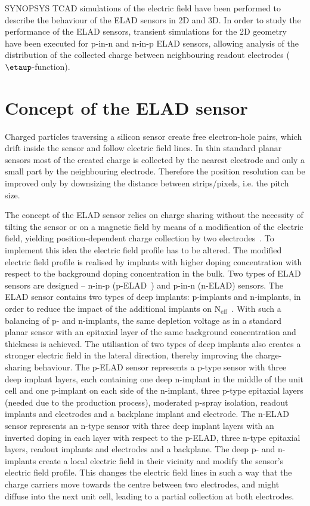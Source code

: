 \documentclass[a4paper,11pt]{article}
\begin{document}
SYNOPSYS TCAD simulations of the electric field have been performed to describe the behaviour of the ELAD sensors in 2D and 3D.
In order to study the performance of the ELAD sensors, transient simulations for the 2D geometry have been executed for p-in-n and n-in-p ELAD sensors,
 allowing analysis of the distribution of the collected charge between neighbouring readout electrodes ($\etaup$-function). 

\section{Concept of the ELAD sensor}
\label{sec:con}
Charged particles traversing a silicon sensor create free electron-hole pairs, which drift inside the sensor and follow electric field lines.
In thin standard planar sensors most of the created charge is collected by the nearest electrode and only a small part by the neighbouring electrode.
Therefore the position resolution can be improved only by downsizing the distance between strips/pixels, i.e. the pitch size.

The concept of the ELAD sensor relies on charge sharing without the necessity of tilting the sensor or on a magnetic field by means of a modification of the electric field,
 yielding position-dependent charge collection by two electrodes~\cite{hj}.
To implement this idea the electric field profile has to be altered.
The modified electric field profile is realised by implants with higher doping concentration with respect to the background doping concentration in the bulk. 
Two types of ELAD sensors are designed -- n-in-p (p-ELAD~\cite{elad}) and p-in-n (n-ELAD) sensors. 
The ELAD sensor contains two types of deep implants: p-implants and n-implants, in order to reduce the impact of the additional implants on $\mathrm{N_{eff}}$~\cite{elad}. 
With such a balancing of p- and n-implants, the same depletion voltage as in a standard planar sensor with an epitaxial layer of the same background concentration and thickness is achieved.
The utilisation of two types of deep implants also creates a stronger electric field in the lateral direction, thereby improving the charge-sharing behaviour.
The p-ELAD sensor represents a p-type sensor with three deep implant layers, each containing one deep n-implant in the middle of the unit cell and one p-implant on each side of the n-implant,
 three p-type epitaxial layers (needed due to the production process), moderated p-spray isolation, readout implants and electrodes and a backplane implant and electrode.
The n-ELAD sensor represents an n-type sensor with three deep implant layers with an inverted doping in each layer with respect to the p-ELAD, three n-type epitaxial layers, readout implants and electrodes and a backplane.
The deep p- and n-implants create a local electric field in their vicinity and modify the sensor's electric field profile.
This changes the electric field lines in such a way that the charge carriers move towards the centre between two electrodes, and might diffuse into the next unit cell, leading to a partial collection at both electrodes.
\end{document}
